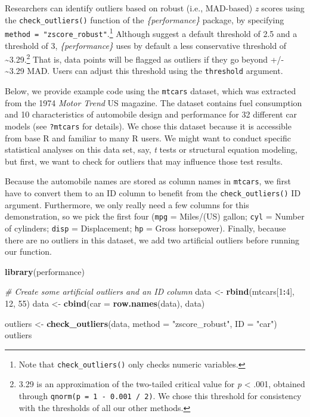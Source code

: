 \documentclass[sn-basic, lineno,pdflatex]{sn-jnl}
\newenvironment{Shaded}{\begin{snugshade}}{\end{snugshade}}
\newcommand{\AttributeTok}[1]{\textcolor[rgb]{0.13,0.29,0.53}{#1}}
\newcommand{\CommentTok}[1]{\textcolor[rgb]{0.56,0.35,0.01}{\textit{#1}}}
\newcommand{\DecValTok}[1]{\textcolor[rgb]{0.00,0.00,0.81}{#1}}
\newcommand{\FunctionTok}[1]{\textcolor[rgb]{0.13,0.29,0.53}{\textbf{#1}}}
\newcommand{\NormalTok}[1]{#1}
\newcommand{\OtherTok}[1]{\textcolor[rgb]{0.56,0.35,0.01}{#1}}
\newcommand{\SpecialCharTok}[1]{\textcolor[rgb]{0.81,0.36,0.00}{\textbf{#1}}}
\newcommand{\StringTok}[1]{\textcolor[rgb]{0.31,0.60,0.02}{#1}}
\begin{document}
Researchers can identify outliers based on robust (i.e., MAD-based)
\emph{z} scores using the \texttt{check\_outliers()} function of the
\emph{\{performance\}} package, by specifying
\texttt{method\ =\ "zscore\_robust"}.\footnote{Note that
  \texttt{check\_outliers()} only checks numeric variables.} Although
\citet{leys2013outliers} suggest a default threshold of 2.5 and
\citet{leys2019outliers} a threshold of 3, \emph{\{performance\}} uses
by default a less conservative threshold of
\textasciitilde3.29.\footnote{3.29 is an approximation of the two-tailed
  critical value for \emph{p} \textless{} .001, obtained through
  \texttt{qnorm(p\ =\ 1\ -\ 0.001\ /\ 2)}. We chose this threshold for
  consistency with the thresholds of all our other methods.} That is,
data points will be flagged as outliers if they go beyond +/-
\textasciitilde3.29 MAD. Users can adjust this threshold using the
\texttt{threshold} argument.

Below, we provide example code using the \texttt{mtcars} dataset, which
was extracted from the 1974 \emph{Motor Trend} US magazine. The dataset
contains fuel consumption and 10 characteristics of automobile design
and performance for 32 different car models (see \texttt{?mtcars} for
details). We chose this dataset because it is accessible from base R and
familiar to many R users. We might want to conduct specific statistical
analyses on this data set, say, \emph{t} tests or structural equation
modeling, but first, we want to check for outliers that may influence
those test results.

Because the automobile names are stored as column names in
\texttt{mtcars}, we first have to convert them to an ID column to
benefit from the \texttt{check\_outliers()} ID argument. Furthermore, we
only really need a few columns for this demonstration, so we pick the
first four (\texttt{mpg} = Miles/(US) gallon; \texttt{cyl} = Number of
cylinders; \texttt{disp} = Displacement; \texttt{hp} = Gross
horsepower). Finally, because there are no outliers in this dataset, we
add two artificial outliers before running our function.

\begin{Shaded}
\begin{Highlighting}[]
\FunctionTok{library}\NormalTok{(performance)}

\CommentTok{\# Create some artificial outliers and an ID column}
\NormalTok{data }\OtherTok{\textless{}{-}} \FunctionTok{rbind}\NormalTok{(mtcars[}\DecValTok{1}\SpecialCharTok{:}\DecValTok{4}\NormalTok{], }\DecValTok{12}\NormalTok{, }\DecValTok{55}\NormalTok{)}
\NormalTok{data }\OtherTok{\textless{}{-}} \FunctionTok{cbind}\NormalTok{(}\AttributeTok{car =} \FunctionTok{row.names}\NormalTok{(data), data)}

\NormalTok{outliers }\OtherTok{\textless{}{-}} \FunctionTok{check\_outliers}\NormalTok{(data, }\AttributeTok{method =} \StringTok{"zscore\_robust"}\NormalTok{, }\AttributeTok{ID =} \StringTok{"car"}\NormalTok{)}
\NormalTok{outliers}
\end{Highlighting}
\end{Shaded}
\end{document}
